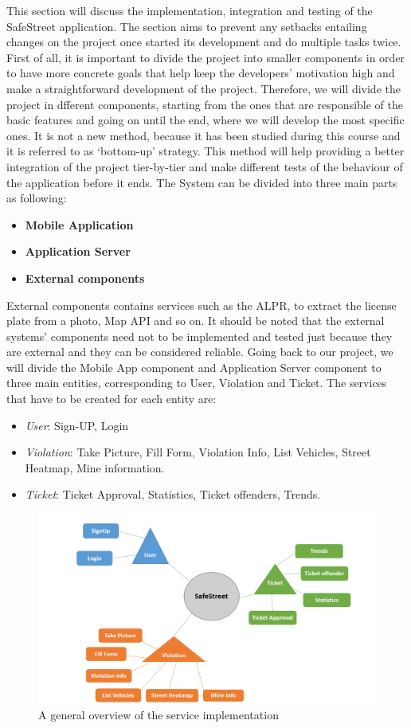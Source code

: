 This section will discuss the implementation, integration and testing of the SafeStreet application. The section aims to prevent any setbacks entailing changes on the project once started its development and do multiple tasks twice. First of all, it is important to divide the project into smaller components in order to have more concrete goals that help keep the developers’ motivation high and make a straightforward development of the project. Therefore, we will divide the project in dfferent components, starting from the ones that are responsible of the basic features and going on until the end, where we will develop the most speciﬁc ones. It is not a new method, because it has been studied during this course and it is referred to as ‘bottom-up’ strategy. This method will help providing a better integration of the project tier-by-tier and make different tests of the behaviour of the application before it ends. The System can be divided into three main parts as following:
\begin{itemize}
    \item \textbf{Mobile Application}
    \item \textbf{Application Server}
    \item \textbf{External components} 
\end{itemize}
External components contains services such as the ALPR, to extract the license plate from a photo, Map API and  so on. It should be noted that the external systems’ components need not to be implemented and tested just because they are external and they can be considered reliable.
Going back to our project, we will divide the Mobile App component and Application Server component to three main entities, corresponding to User, Violation and Ticket.
The services that have to be created for each entity are:
\begin{itemize}
\item{} \textit{User}: Sign-UP, Login
\item{} \textit{Violation}: Take Picture, Fill Form, Violation Info, List Vehicles, Street Heatmap, Mine information.
\item{} \textit{Ticket}: Ticket Approval, Statistics, Ticket offenders, Trends.
\end{itemize}

\begin{figure}
\centering
\includegraphics[width=\textwidth]{Images/ImplemetationandTest.png}
\caption{\label{fig:Test} A general overview of the service implementation}
\end{figure}

